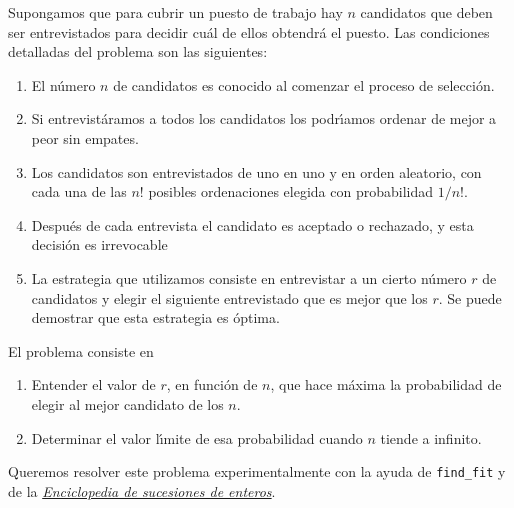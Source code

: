 \begin{ejer}
 
 Supongamos que para cubrir un puesto de trabajo hay $n$ candidatos que deben 
ser entrevistados para decidir cu\'al de ellos obtendr\'a el puesto. Las 
condiciones detalladas del problema son las siguientes:

\begin{enumerate}
 \item El n\'umero $n$ de candidatos es conocido al comenzar el proceso de 
selecci\'on.
 
 \item Si entrevist\'aramos a todos los candidatos los podr\'{\i}amos ordenar 
de mejor a peor sin empates. 
 
 \item Los candidatos son entrevistados de uno en uno y en orden aleatorio, con 
cada una de  las $n!$ posibles ordenaciones elegida con probabilidad $1/n!.$
 
 \item Despu\'es de cada entrevista el candidato es aceptado o rechazado,  y 
esta decisi\'on es irrevocable


 \item La estrategia que utilizamos consiste en entrevistar a un cierto 
n\'umero $r$ de candidatos y elegir el siguiente entrevistado que es mejor que 
los $r$. Se puede demostrar que esta estrategia es \'optima. 
 
 \end{enumerate}

El problema consiste en 
\begin{enumerate}
\item Entender el valor de $r$, en funci\'on de $n$, que hace 
m\'axima la probabilidad de elegir al mejor candidato de los $n$.
\item Determinar el valor l\'{\i}mite de esa probabilidad cuando $n$ tiende a 
infinito. 
\end{enumerate}
 
Queremos resolver este problema experimentalmente con la ayuda de 
\lstinline|find_fit| y de la  
 \href{https://oeis.org/}{{\itshape  Enciclopedia de sucesiones de enteros}}.
 
 
\end{ejer}

\begin{ejer}
 
\end{ejer}

\begin{ejer}
 
\end{ejer}
 

 

 
 
 
 
 
 
 
 
 
 
 
 


 



 



















